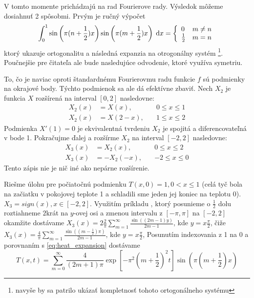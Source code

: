 V tomto momente prichádzajú na rad Fourierove rady. Výsledok môžeme dosiahnuť
2 spôsobmi. Prvým je ručný výpočet
\begin{equation}
    \int_0^1 \sin\left(\pi(n+\frac{1}{2})x\right)
             \sin\left(\pi(m+\frac{1}{2})x\right) \; \mathrm{d} x =
    \left\{
    \begin{array}{l l}
        0& m\not=n \\
        \frac{1}{2} & m=n
    \end{array}
    \right.
\end{equation}
ktorý ukazuje ortogonalitu a následná expanzia na otrogonálny systém
\footnote{navyše by sa patrilo ukázať kompletnosť tohoto ortogonálneho
systému}.
Poučnejšie pre čitateľa ale bude nasledujúce odvodenie, ktoré využíva
symetriu.

To, čo je naviac oproti štandardnému Fourierovmu radu funkcie $f$ 
sú podmienky na okrajové body.
Týchto podmienok sa ale dá efektívne zbaviť.
Nech $X_2$ je funkcia $X$ rozšírená na interval $[0,2]$ nasledovne:
\begin{align}
    X_2(x) &= X(x), \quad &0\le x \le 1 \\
    X_2(x) &= X(2-x), \quad &1\le x \le 2
\end{align}
Podmienka $X'(1) = 0$ je ekvivalentná tvrdeniu
$X_2$ je spojitá a diferencovateľná v bode 1.
Pokračujme ďalej a rozšírme $X_2$ na interval $[-2,2]$ nasledovne:
\begin{align}
    X_3(x) &= X_2(x), \quad &0\le x \le 2 \\
    X_3(x) &= - X_2(-x), \quad &-2 \le x \le 0
\end{align}
Tento zápis nie je nič iné ako nepárne rozšírenie.

Riešme úlohu pre počiatočnú podmienku $T(x,0)=1, 0<x\le1$ (celá tyč
bola na začiatku v pokojovej teplote 1 a schladili sme jeden jej
koniec na teplotu 0).
$X_3 = sign(x), x\in[-2,2]$. Využitím príkladu , ktorý
posunieme o $\frac{1}{2}$ dolu roztiahneme $2$krát na $y$-ovej osi 
a zmenou intervalu z $[-\pi,\pi]$ na $[-2,2]$ okamžite dostávame
$X_3(x) = 2 \frac{2}{\pi} \sum_{m=1}^\infty
  \frac{\sin((2m-1) y)}{2m-1}$, kde $y=x \frac{\pi}{2}$,
  čiže
$X_3(x) = \frac{4}{\pi} \sum_{m=1}^\infty
  \frac{\sin((m-\frac{1}{2})\pi )}{2m-1}$, kde $y=x \frac{\pi}{2}$,
Posunutím indexovania z 1 na 0 a porovnaním s  \ref{eq:heat_expansion}
dostávame
\begin{equation}
T(x,t) = \sum_{m=0}^{\infty} \frac{4}{(2m+1)\pi} 
    \exp\left[-\pi^2 (m+\frac{1}{2})^2 t \right] 
    \sin\left( \pi(m+\frac{1}{2}) x \right)
\end{equation}
